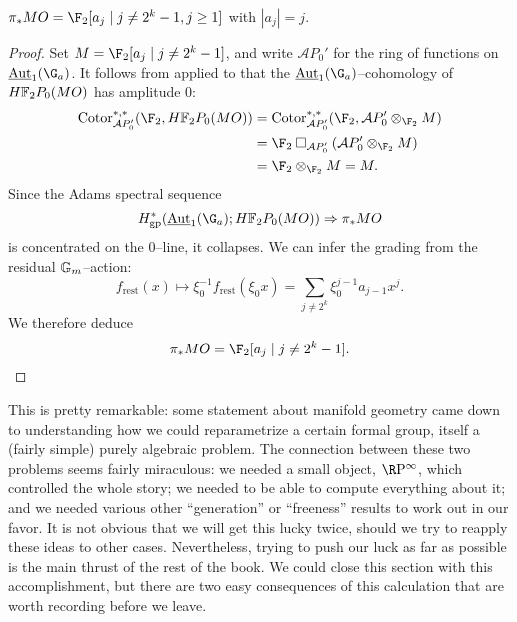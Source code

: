 \begin{corollary}\label{CalculationOfPiStarMO}
\(\pi_* MO = \F_2[a_j \mid j \ne 2^k - 1, j \ge 1]\) with \(|a_j| = j\).
\end{corollary}
\begin{proof}
Set \(M = \F_2[a_j \mid j \ne 2^k - 1]\), and write \(\mathcal AP_0'\) for the ring of functions on \(\InternalAut_1(\G_a)\).  It follows from  applied to  that the \(\InternalAut_1(\G_a)\)--cohomology of \(\HFtwo P_0(MO)\) has amplitude \(0\):
\begin{align*}
\Cotor_{\mathcal AP_0'}^{*, *}(\F_2, \HFtwo P_0(MO)) & = \Cotor_{\mathcal AP_0'}^{*, *}(\F_2, \mathcal AP_0' \otimes_{\F_2} M) \\
& = \F_2 \cotensor_{\mathcal AP_0'} (\mathcal AP_0' \otimes_{\F_2} M) \\
& = \F_2 \otimes_{\F_2} M = M.
\end{align*}
Since the Adams spectral sequence \[H^*_{\mathrm{gp}}(\InternalAut_1(\G_a); \HFtwo P_0(MO)) \Rightarrow \pi_* MO\] is concentrated on the \(0\)--line, it collapses.  We can infer the grading from the residual \(\mathbb G_m\)--action: \[f_{\mathrm{rest}}(x) \mapsto \xi_0^{-1} f_{\mathrm{rest}}(\xi_0 x) = \sum_{j \ne 2^k} \xi_0^{j-1} a_{j-1} x^j.\]  We therefore deduce \[\pi_* MO = \F_2[a_j \mid j \ne 2^k-1]. \qedhere\]
\end{proof}

This is pretty remarkable: some statement about manifold geometry came down to understanding how we could reparametrize a certain formal group, itself a (fairly simple) purely algebraic problem.  The connection between these two problems seems fairly miraculous: we needed a small object, \(\RP^\infty\), which controlled the whole story; we needed to be able to compute everything about it; and we needed various other ``generation'' or ``freeness'' results to work out in our favor.  It is not obvious that we will get this lucky twice, should we try to reapply these ideas to other cases.  Nevertheless, trying to push our luck as far as possible is the main thrust of the rest of the book.  We could close this section with this accomplishment, but there are two easy consequences of this calculation that are worth recording before we leave.

